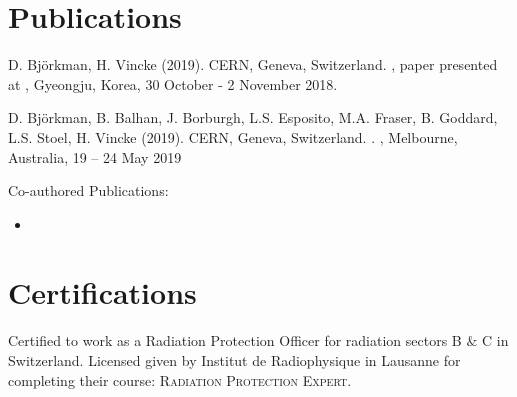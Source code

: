 \documentclass[a4paper,10pt]{article}
\newcommand{\MYhref}[3][blue]{\href{#2}{\color{#1}{#3}}}%
\begin{document}
 
 
 
 
 
 
\section{Publications}
{\small 
\begin{enumerate}[label={[\arabic*]}]
  \item D. Björkman, H. Vincke (2019). CERN, Geneva, Switzerland. \MYhref{https://www.oecd-nea.org/science/wprs/egsaatif/}{"High Energy Internal Beam Dump System for the Super Proton Synchrotron"}, paper presented at , Gyeongju, Korea, 30 October - 2 November 2018.
 
  \item D. Björkman, B. Balhan, J. Borburgh, L.S. Esposito, M.A. Fraser, B. Goddard, L.S. Stoel, H. Vincke (2019).   CERN, Geneva, Switzerland. \MYhref{http://accelconf.web.cern.ch/AccelConf/ipac2019/papers/wepmp024.pdf}{"Alternative Material Choices to Reduce Activation of Extraction Equipment"}. , Melbourne, Australia, 19 – 24 May 2019
\end{enumerate}
\hspace{7.5mm} Co-authored Publications: \
\begin{itemize}
\setlength{\itemindent}{4mm}
\item \MYhref{https://ipac2019.vrws.de/papers/wepmp031.pdf}{"SPS Slow Extraction Losses and Activation: Update on Recent Improvements"}
\end{itemize}

 
\section{Certifications}
Certified to work as a Radiation Protection Officer for radiation sectors B $\&$ C in Switzerland. Licensed given by Institut de Radiophysique in Lausanne for completing their course: \textsc{Radiation Protection Expert}.
 
 
}
\end{document}
